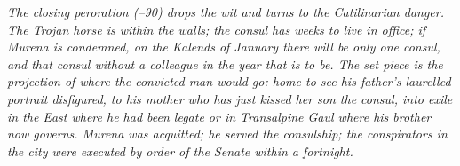 \textit{The closing peroration (--90) drops
the wit and turns to the Catilinarian danger. The Trojan
horse is within the walls; the consul has weeks to live in
office; if Murena is condemned, on the Kalends of January
there will be only one consul, and that consul without a
colleague in the year that is to be. The set piece is the
projection of where the convicted man would go: home to see
his father's laurelled portrait disfigured, to his mother who
has just kissed her son the consul, into exile in the East
where he had been legate or in Transalpine Gaul where his
brother now governs. Murena was acquitted; he served the
consulship; the conspirators in the city were executed by
order of the Senate within a fortnight.}
